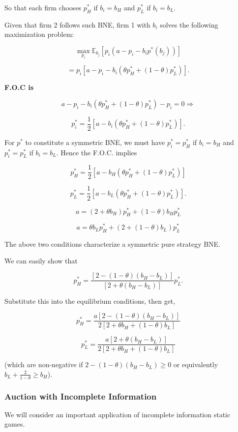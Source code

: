 \documentclass[12pt, oneside]{article}
\begin{document}
So that each firm chooses \( p^*_H \) if \( b_i = b_H \) and \( p^*_L \) if \( b_i = b_L \).

Given that firm 2 follows such BNE, firm 1 with \( b_i \) solves the following maximization problem:

\[
\max_{p_i} \mathbb{E}_{b_j} [p_i (a - p_i - b_i p^*(b_j))]
\]

\[
= p_i [a - p_i - b_i (\theta p^*_H + (1 - \theta) p^*_L)].
\]

\textbf{F.O.C is}

\[
a - p_i - b_i (\theta p^*_H + (1 - \theta) p^*_L) - p_i = 0 \Rightarrow
\]

\[
p^*_i = \frac{1}{2} [a - b_i (\theta p^*_H + (1 - \theta) p^*_L)].
\]

For \( p^* \) to constitute a symmetric BNE, we must have \( p^*_i = p^*_H \) if \( b_i = b_H \) and \( p^*_i = p^*_L \) if \( b_i = b_L \). Hence the F.O.C. implies

\[
p^*_H = \frac{1}{2} [a - b_H (\theta p^*_H + (1 - \theta) p^*_L)]
\]

\[
p^*_L = \frac{1}{2} [a - b_L (\theta p^*_H + (1 - \theta) p^*_L)].
\]

\[
a = (2 + \theta b_H) p^*_H + (1 - \theta) b_H p^*_L
\]

\[
a = \theta b_L p^*_H + (2 + (1 - \theta) b_L) p^*_L
\]

The above two conditions characterize a symmetric pure strategy BNE.

We can easily show that

\[
p^*_H = \frac{[2 - (1 - \theta)(b_H - b_L)]}{[2 + \theta(b_H - b_L)]} p^*_L.
\]

Substitute this into the equilibrium conditions, then get,

\[
p^*_H = \frac{a [2 - (1 - \theta)(b_H - b_L)]}{2 [2 + \theta b_H + (1 - \theta) b_L]}
\]

\[
p^*_L = \frac{a [2 + \theta (b_H - b_L)]}{2 [2 + \theta b_H + (1 - \theta) b_L]}
\]

(which are non-negative if \( 2 - (1 - \theta)(b_H - b_L) \geq 0 \) or equivalently \( b_L + \frac{2}{1-\theta} \geq b_H \)).



\subsubsection{Auction with Incomplete Information}
We will consider an important application of incomplete information static games.  
\end{document}
